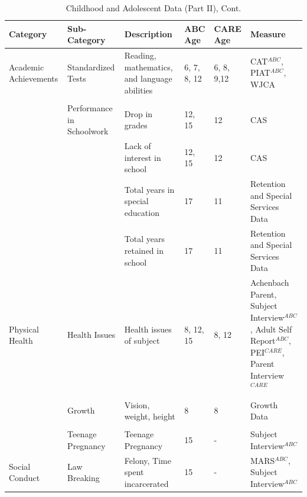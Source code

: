 \documentclass[static]{JJH-Beamer}
\begin{document}
\begin{frame}
 \addtocounter{framenumber}{-1}

\begin{table}[H]
\addtocounter{table}{-1}
\caption{Childhood and Adolescent Data (Part II), Cont.}
\begin{center}
\begin{tiny}
\begin{tabular}{L{1.2cm} C{1.4cm} C{2.5cm} C{.9cm} C{.8cm} C{2.9cm}}
\toprule
\textbf{Category}	&	\textbf{Sub-Category}	&	\textbf{Description}	&	\textbf{ABC Age}  	&  \textbf{CARE Age}  & 	\textbf{Measure}	\\ \midrule
Academic Achievements	&	Standardized Tests	&	Reading, mathematics, and language abilities	&	6, 7, 8, 12	&	6, 8, 9,12	&	CAT$^{ABC}$, PIAT$^{ABC}$, WJCA	\\
		&	\\
	&	Performance in Schoolwork	&	Drop in grades	&	12, 15		&	12	&	CAS	\\
	&		&	Lack of interest in school	&	12, 15		&	12	&	CAS	\\
	&		&  Total years in special education & 17 & 11 & Retention and Special Services Data \\
	&		&  Total years retained in school & 17 & 11 & Retention and Special Services Data \\  \midrule
Physical Health	&	Health Issues	&	Health issues of subject	&	8, 12, 15	&	8, 12	&	Achenbach Parent, Subject Interview$^{ABC}$, Adult Self Report$^{ABC}$, PEI$^{CARE}$, Parent Interview$^{CARE}$	\\
	&	\\
	&	Growth	&	Vision, weight, height	&	8	&	8	&	Growth Data	\\
	&	\\
	&	Teenage Pregnancy	&	Teenage Pregnancy	&	15	&	- 	& Subject Interview$^{ABC}$		\\ \midrule
Social Conduct	&	Law Breaking	&	Felony, Time spent incarcerated	&	15	&	- 	&	MARS$^{ABC}$, Subject Interview$^{ABC}$	\\ \bottomrule
\end{tabular}
\end{tiny}
\end{center}
\end{table}

\end{frame}
\end{document}
